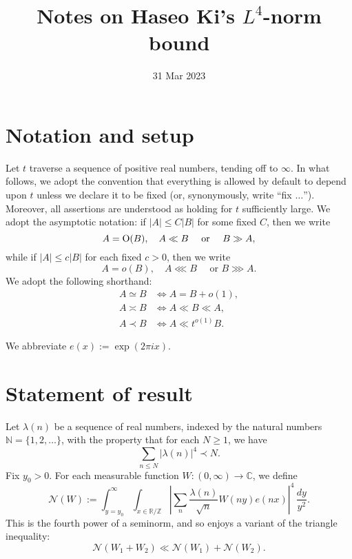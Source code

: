 \documentclass[reqno]{amsart} 
\begin{document}
\title{Notes on Haseo Ki's $L^4$-norm bound}
\date{31 Mar 2023}
\maketitle
\tableofcontents

\section{Notation and setup}
Let $t$ traverse a sequence of positive real numbers, tending off to $\infty$.  In what follows, we adopt the convention that everything is allowed by default to depend upon $t$ unless we declare it to be fixed (or, synonymously, write ``fix $\dotsc$'').  Moreover, all assertions are understood as holding for $t$ sufficiently large.  We adopt the asymptotic notation: if $|A| \leq C |B|$ for some fixed $C$, then we write
\begin{equation*}
  A = \operatorname{O}(B), \quad A \ll B \quad \text{ or } \quad  B \gg A,
\end{equation*}
while if $|A| \leq c |B|$ for each fixed $c > 0$, then we write
\begin{equation*}
  A = o(B), \quad  A \lll B \quad \text{ or }  B \ggg A.
\end{equation*}
We adopt the following shorthand:
\begin{align*}
  A \simeq B
  &\iff
    A = B + o(1),  \\
  A \asymp B &\iff A \ll B \ll A, \\
  A \prec B &\iff A \ll t^{o(1)} B.
\end{align*}

We abbreviate $e(x) := \exp(2 \pi i x)$.

\section{Statement of result}
Let $\lambda(n)$ be a sequence of real numbers, indexed by the natural numbers $\mathbb{N} = \{1, 2, \dotsc \}$, with the property that for each $N \geq 1$, we have
\begin{equation}\label{eqn:fourth-moment-bound-lambda}
  \sum_{n \leq N} \left\lvert \lambda(n) \right\rvert^4 \prec N.
\end{equation}
Fix $y_0 > 0$.  For each measurable function $W : (0,\infty) \rightarrow \mathbb{C}$, we define
\begin{equation}\label{eqn:definition-N-of-W}
  \mathcal{N} (W) :=
  \int _{y = y _0 } ^\infty
  \int _{x \in \mathbb{R} / \mathbb{Z} }
  \left\lvert
    \sum _{n} \frac{\lambda(n)}{\sqrt{n}} W (n y) e (n x)
  \right\rvert ^4    \, \frac{d y}{ y ^2 }.
\end{equation}
This is the fourth power of a seminorm, and so enjoys a variant of the triangle inequality:
\begin{equation*}
  \mathcal{N} (W _1 + W _2) \ll \mathcal{N} (W _1 ) + \mathcal{N} (W _2 ).
\end{equation*}
\end{document}
